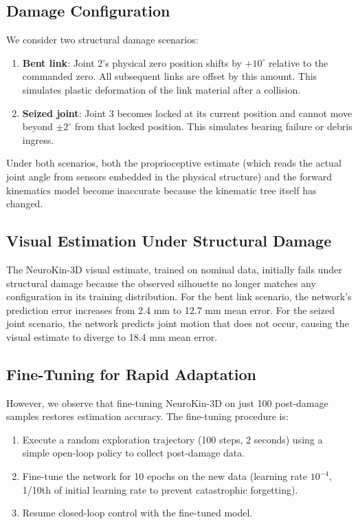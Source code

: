 \documentclass[12pt,a4paper,oneside]{report}
\begin{document}
\subsection{Damage Configuration}

We consider two structural damage scenarios:

\begin{enumerate}
    \item \textbf{Bent link}: Joint 2's physical zero position shifts by $+10^\circ$ relative to the commanded zero. All subsequent links are offset by this amount. This simulates plastic deformation of the link material after a collision.
    \item \textbf{Seized joint}: Joint 3 becomes locked at its current position and cannot move beyond $\pm2^\circ$ from that locked position. This simulates bearing failure or debris ingress.
\end{enumerate}

Under both scenarios, both the proprioceptive estimate (which reads the actual joint angle from sensors embedded in the physical structure) and the forward kinematics model become inaccurate because the kinematic tree itself has changed.

\subsection{Visual Estimation Under Structural Damage}

The NeuroKin-3D visual estimate, trained on nominal data, initially fails under structural damage because the observed silhouette no longer matches any configuration in its training distribution. For the bent link scenario, the network's prediction error increases from 2.4 mm to 12.7 mm mean error. For the seized joint scenario, the network predicts joint motion that does not occur, causing the visual estimate to diverge to 18.4 mm mean error.

\subsection{Fine-Tuning for Rapid Adaptation}

However, we observe that fine-tuning NeuroKin-3D on just 100 post-damage samples restores estimation accuracy. The fine-tuning procedure is:

\begin{enumerate}
    \item Execute a random exploration trajectory (100 steps, 2 seconds) using a simple open-loop policy to collect post-damage data.
    \item Fine-tune the network for 10 epochs on the new data (learning rate $10^{-4}$, 1/10th of initial learning rate to prevent catastrophic forgetting).
    \item Resume closed-loop control with the fine-tuned model.
\end{enumerate}
\end{document}
